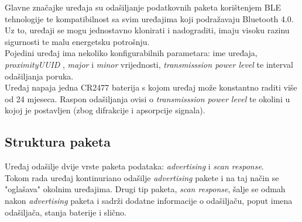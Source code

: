 Glavne značajke uređaja su odašiljanje podatkovnih paketa korištenjem BLE tehnologije te kompatibilnost sa svim uređajima koji podražavaju Bluetooth 4.0. 
Uz to, uređaji se mogu jednostavno klonirati i nadograditi, imaju visoku razinu sigurnosti te malu energetsku potrošnju.
\\
Pojedini uređaj ima nekoliko konfigurabilnih parametara: ime uređaja, \textit{proximityUUID} , \textit{major} i \textit{minor} vrijednosti, \textit{transmisssion power level} te interval odašiljanja poruka.
\\
Uređaj napaja jedna CR2477 baterija s kojom uređaj može konstantno raditi više od 24 mjeseca. %
Raspon odašiljanja ovisi o \textit{transmisssion power level} te okolini u kojoj je postavljen (zbog difrakcije i apsorpcije signala).

\subsection*{Struktura paketa}
Uređaj odašilje dvije vrste paketa podataka: \textit{advertising} i \textit{scan response}.
\\
Tokom rada uređaj kontinuriano odašilje \textit{advertising} pakete i na taj način se "oglašava" okolnim uređajima. Drugi tip paketa, \textit{scan response}, šalje se odmah nakon \textit{advertising} paketa i sadrži dodatne informacije o odašiljaču, poput imena odašiljača, stanja baterije i slično.
\\

